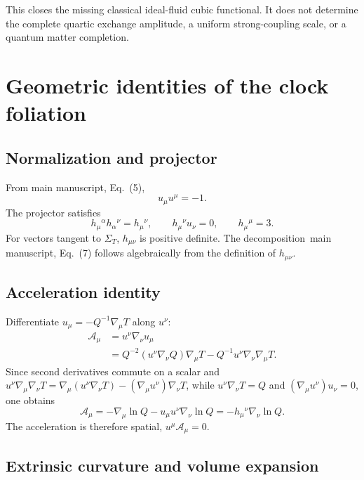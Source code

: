 \documentclass[aps,prd,reprint,onecolumn,notitlepage,nofootinbib,longbibliography,floatfix]{revtex4-2}
\theoremstyle{scstyle}
\theoremstyle{definition}
\theoremstyle{remark}
\newcommand{\cA}{\mathcal A}
\begin{document}
This closes the missing classical ideal-fluid cubic functional. It
does not determine the complete quartic exchange amplitude, a uniform
strong-coupling scale, or a quantum matter completion.


\appendix
\section{Geometric identities of the clock foliation}
\label{app:geometry}

\subsection{Normalization and projector}

From main manuscript, Eq.~(5),
\begin{equation}
u_\mu u^\mu=-1.
\label{eq:unormapp}
\end{equation}
The projector satisfies
\begin{equation}
h_\mu{}^\alpha h_\alpha{}^\nu=h_\mu{}^\nu,
\qquad
h_\mu{}^\nu u_\nu=0,
\qquad
h_\mu{}^\mu=3.
\label{eq:hprojectorapp}
\end{equation}
For vectors tangent to $\Sigma_T$, $h_{\mu\nu}$ is positive definite. The decomposition~main manuscript, Eq.~(7) follows algebraically from the definition of $h_{\mu\nu}$.

\subsection{Acceleration identity}

Differentiate $u_\mu=-Q^{-1}\nabla_\mu T$ along $u^\nu$:
\begin{align}
\cA_\mu
&=u^\nu\nabla_\nu u_\mu\nonumber\\
&=Q^{-2}(u^\nu\nabla_\nu Q)\nabla_\mu T
-Q^{-1}u^\nu\nabla_\nu\nabla_\mu T.
\label{eq:accstep1}
\end{align}
Since second derivatives commute on a scalar and $u^\nu\nabla_\mu\nabla_\nu T=\nabla_\mu(u^\nu\nabla_\nu T)-(\nabla_\mu u^\nu)\nabla_\nu T$, while $u^\nu\nabla_\nu T=Q$ and $(\nabla_\mu u^\nu)u_\nu=0$, one obtains
\begin{equation}
\cA_\mu
=-\nabla_\mu\ln Q-u_\mu u^\nu\nabla_\nu\ln Q
=-h_\mu{}^\nu\nabla_\nu\ln Q.
\label{eq:accproof}
\end{equation}
The acceleration is therefore spatial, $u^\mu\cA_\mu=0$.

\subsection{Extrinsic curvature and volume expansion}
\end{document}

